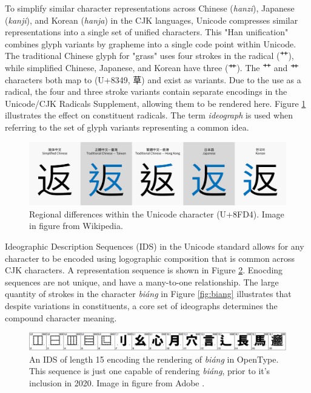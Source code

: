 To simplify similar character representations across Chinese (\textit{hanzi}), Japanese (\textit{kanji}), and Korean (\textit{hanja}) in the CJK languages, Unicode compresses similar representations into a single set of unified characters. This "Han unification" combines glyph variants by grapheme into a single code point within Unicode. The traditional Chinese glyph for "grass" uses four strokes in the radical (⺿), while simplified Chinese, Japanese, and Korean have three (⺾). The ⺿ and ⺾ characters both map to (U+8349, 草) and exist as variants. Due to the use as a radical, the four and three stroke variants contain separate encodings in the Unicode/CJK Radicals Supplement, allowing them to be rendered here.
Figure \ref{fig:han-unification} illustrates the effect on constituent radicals. The term \textit{ideograph} is used when referring to the set of glyph variants representing a common idea.

\begin{figure}[h]
    \begin{center}
        \includegraphics[width=1\textwidth]{figures/han_unification.png}
        \caption[Regional Character Variants]{Regional differences within the Unicode character (U+8FD4).
            Image in figure from Wikipedia\cite{wikipedia-han-unification}.}
        \label{fig:han-unification}
    \end{center}
\end{figure}

Ideographic Description Sequences (IDS) in the Unicode standard\cite{unicode-ids} allows for any character to be encoded using logographic composition that is common across CJK characters. A representation sequence is shown in Figure \ref{fig:biang-ids}. Enocding sequences are not unique, and have a many-to-one relationship. The large quantity of strokes in the character \textit{biáng} in Figure \ref{fig:biang} illustrates that despite variations in constituents, a core set of ideographs determines the compound character meaning.

\begin{figure}[h]
    \begin{center}
        \includegraphics[width=1\textwidth]{figures/ids-biang.jpg}
        \caption[Unicode Ideographic Description Sequences]{An IDS of length 15 encoding the rendering of \textit{biáng} in OpenType. This sequence is just one capable of rendering \textit{biáng}, prior to it's inclusion in 2020\cite{unicode-ids}.
            Image in figure from Adobe \cite{adobe-ids}.}
        \label{fig:biang-ids}
    \end{center}
\end{figure}

